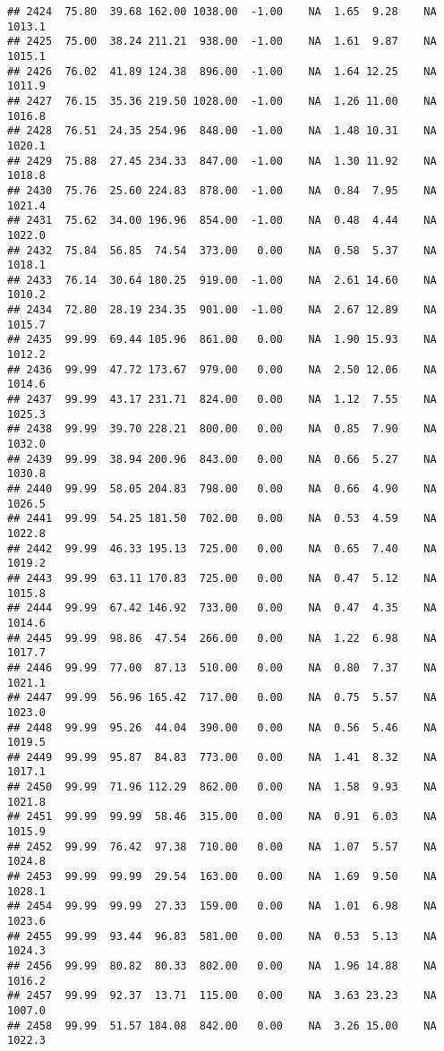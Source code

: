 \documentclass{article}\usepackage{graphicx, color}
\makeatletter
\newenvironment{kframe}{%
 \def\at@end@of@kframe{}%
 \ifinner\ifhmode%
  \def\at@end@of@kframe{\end{minipage}}%
  \begin{minipage}{\columnwidth}%
 \fi\fi%
 \def\FrameCommand##1{\hskip\@totalleftmargin \hskip-\fboxsep
 \colorbox{shadecolor}{##1}\hskip-\fboxsep
     \hskip-\linewidth \hskip-\@totalleftmargin \hskip\columnwidth}%
 \MakeFramed {\advance\hsize-\width
   \@totalleftmargin\z@ \linewidth\hsize
   \@setminipage}}%
 {\par\unskip\endMakeFramed%
 \at@end@of@kframe}
\newenvironment{knitrout}{}{} %
\makeatother
\begin{document}
\begin{knitrout}
\begin{kframe}
\begin{verbatim}
## 2424  75.80  39.68 162.00 1038.00  -1.00    NA  1.65  9.28    NA 1013.1
## 2425  75.00  38.24 211.21  938.00  -1.00    NA  1.61  9.87    NA 1015.1
## 2426  76.02  41.89 124.38  896.00  -1.00    NA  1.64 12.25    NA 1011.9
## 2427  76.15  35.36 219.50 1028.00  -1.00    NA  1.26 11.00    NA 1016.8
## 2428  76.51  24.35 254.96  848.00  -1.00    NA  1.48 10.31    NA 1020.1
## 2429  75.88  27.45 234.33  847.00  -1.00    NA  1.30 11.92    NA 1018.8
## 2430  75.76  25.60 224.83  878.00  -1.00    NA  0.84  7.95    NA 1021.4
## 2431  75.62  34.00 196.96  854.00  -1.00    NA  0.48  4.44    NA 1022.0
## 2432  75.84  56.85  74.54  373.00   0.00    NA  0.58  5.37    NA 1018.1
## 2433  76.14  30.64 180.25  919.00  -1.00    NA  2.61 14.60    NA 1010.2
## 2434  72.80  28.19 234.35  901.00  -1.00    NA  2.67 12.89    NA 1015.7
## 2435  99.99  69.44 105.96  861.00   0.00    NA  1.90 15.93    NA 1012.2
## 2436  99.99  47.72 173.67  979.00   0.00    NA  2.50 12.06    NA 1014.6
## 2437  99.99  43.17 231.71  824.00   0.00    NA  1.12  7.55    NA 1025.3
## 2438  99.99  39.70 228.21  800.00   0.00    NA  0.85  7.90    NA 1032.0
## 2439  99.99  38.94 200.96  843.00   0.00    NA  0.66  5.27    NA 1030.8
## 2440  99.99  58.05 204.83  798.00   0.00    NA  0.66  4.90    NA 1026.5
## 2441  99.99  54.25 181.50  702.00   0.00    NA  0.53  4.59    NA 1022.8
## 2442  99.99  46.33 195.13  725.00   0.00    NA  0.65  7.40    NA 1019.2
## 2443  99.99  63.11 170.83  725.00   0.00    NA  0.47  5.12    NA 1015.8
## 2444  99.99  67.42 146.92  733.00   0.00    NA  0.47  4.35    NA 1014.6
## 2445  99.99  98.86  47.54  266.00   0.00    NA  1.22  6.98    NA 1017.7
## 2446  99.99  77.00  87.13  510.00   0.00    NA  0.80  7.37    NA 1021.1
## 2447  99.99  56.96 165.42  717.00   0.00    NA  0.75  5.57    NA 1023.0
## 2448  99.99  95.26  44.04  390.00   0.00    NA  0.56  5.46    NA 1019.5
## 2449  99.99  95.87  84.83  773.00   0.00    NA  1.41  8.32    NA 1017.1
## 2450  99.99  71.96 112.29  862.00   0.00    NA  1.58  9.93    NA 1021.8
## 2451  99.99  99.99  58.46  315.00   0.00    NA  0.91  6.03    NA 1015.9
## 2452  99.99  76.42  97.38  710.00   0.00    NA  1.07  5.57    NA 1024.8
## 2453  99.99  99.99  29.54  163.00   0.00    NA  1.69  9.50    NA 1028.1
## 2454  99.99  99.99  27.33  159.00   0.00    NA  1.01  6.98    NA 1023.6
## 2455  99.99  93.44  96.83  581.00   0.00    NA  0.53  5.13    NA 1024.3
## 2456  99.99  80.82  80.33  802.00   0.00    NA  1.96 14.88    NA 1016.2
## 2457  99.99  92.37  13.71  115.00   0.00    NA  3.63 23.23    NA 1007.0
## 2458  99.99  51.57 184.08  842.00   0.00    NA  3.26 15.00    NA 1022.3

\end{verbatim}
\end{kframe}
\end{knitrout}
\end{document}

